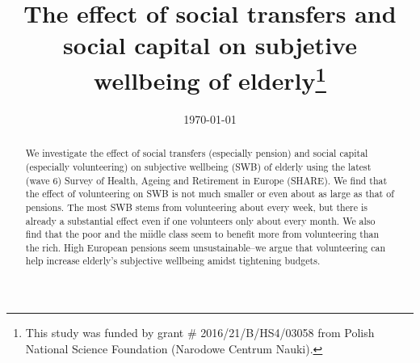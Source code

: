 \documentclass[10pt, letterpaper]{article}
\date{{}\today}
\title{  
The effect of social transfers and social capital on subjetive wellbeing of
elderly\footnote{This study was funded by grant \# 2016/21/B/HS4/03058 from
  Polish National Science Foundation (Narodowe Centrum Nauki).}
}
\author{
}
\begin{document}

%
\maketitle
\vspace{-.4in}
\begin{center}

\end{center}


\begin{abstract}
\noindent We investigate the effect of social transfers (especially pension) and
social capital (especially volunteering) on subjective wellbeing (SWB) of elderly using the latest (wave 6) Survey of Health, Ageing and Retirement in Europe
(SHARE). We find that the effect of volunteering on SWB is not much smaller or
even about as large as that of pensions. The most SWB stems from volunteering about
every week, but there is already a substantial effect even if one volunteers only
about every month. We also find that the poor and the miidle
class seem to benefit more from volunteering than the rich.
High European pensions seem unsustainable--we argue that volunteering can help increase elderly's subjective wellbeing amidst tightening budgets.
\end{abstract}
\vspace{.15in} 
\vspace{.25in} 
\end{document}
